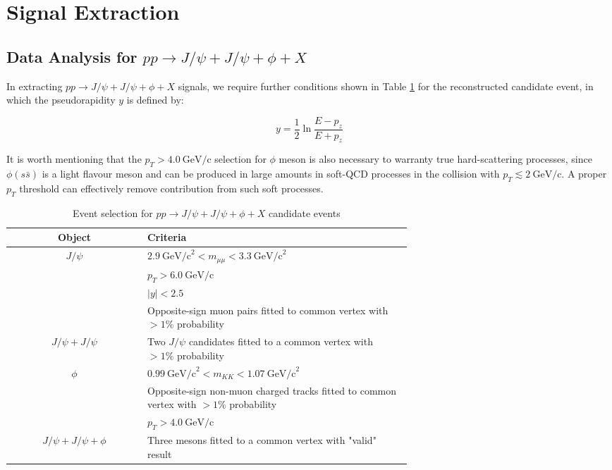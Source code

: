 \documentclass[10pt,twocolumn]{article}
\newcommand*{\GeVc}{~\text{GeV/c}}
\newcommand*{\GeVcs}{~\text{GeV/c}^2}
\begin{document}
\section{Signal Extraction}

\subsection{Data Analysis for $pp\to J/\psi+J/\psi+\phi+X$}

In extracting $pp\to J/\psi+J/\psi+\phi+X$ signals, we require further conditions shown in Table \ref{tab:cut_JpsiJpsiPhi} for the reconstructed candidate event, in which the pseudorapidity $y$ is defined by:

\begin{equation}
    y = \frac{1}{2} \ln \frac {E-p_z}{E+p_z}
\end{equation}

It is worth mentioning that the $p_T > 4.0\GeVc$ selection for $\phi$ meson is also necessary to warranty true hard-scattering processes, since $\phi(s\bar{s})$ is a light flavour meson and can be produced in large amounts in soft-QCD processes in the collision with $p_T\lesssim 2\GeVc$. A proper $p_T$ threshold can effectively remove contribution from such soft processes.

\begin{table}[]
    \centering
    \caption{Event selection for $pp\to J/\psi+J/\psi+\phi+X$ candidate events\\}
    \begin{tabular}{c p{0.66\linewidth}}
        \toprule
        \textbf{Object} & \textbf{Criteria} \\
        \midrule
        $J/\psi$ & $2.9 \GeVcs < m_{\mu\mu} < 3.3 \GeVcs$ \\
                 & $p_T > 6.0\GeVc$ \\
                 & $|y| < 2.5$ \\
                 & Opposite-sign muon pairs fitted to common vertex with $> 1\%$ probability \\
                 \midrule
        $J/\psi+J/\psi$ & Two $J/\psi$ candidates fitted to a common vertex with $> 1\%$ probability \\
        \midrule
        $\phi$ & $0.99 \GeVcs < m_{KK} < 1.07 \GeVcs$ \\
               & Opposite-sign non-muon charged tracks fitted to common vertex with $> 1\%$ probability \\
               & $p_T > 4.0\GeVc$ \\
               \midrule
        $J/\psi+J/\psi+\phi$ & Three mesons fitted to a common vertex with "valid" result \\
        \bottomrule
    \end{tabular}
    \label{tab:cut_JpsiJpsiPhi}
\end{table}
\end{document}
